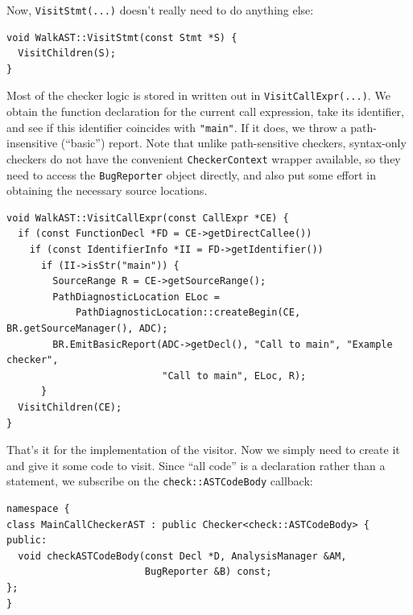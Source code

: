 \documentclass[a4paper,12pt]{article}
\newenvironment{nobr}{\begin{minipage}{\textwidth}\setlength\parskip{1em}
}{\end{minipage}\ignorespacesafterend}
\begin{document}
\begin{nobr}
Now, \lstinline|VisitStmt(...)| doesn't really need to do anything else:
\begin{lstlisting}[style=cplusplus,numbers=none]
void WalkAST::VisitStmt(const Stmt *S) {
  VisitChildren(S);
}
\end{lstlisting}
\end{nobr}

\begin{nobr}
Most of the checker logic is stored in written out in \lstinline|VisitCallExpr(...)|. We obtain the function declaration for the current call expression, take its identifier, and see if this identifier coincides with \lstinline|"main"|. If it does, we throw a path-insensitive (``basic'') report. Note that unlike path-sensitive checkers, syntax-only checkers do not have the convenient \lstinline|CheckerContext| wrapper available, so they need to access the \lstinline|BugReporter| object directly, and also put some effort in obtaining the necessary source locations.
\begin{lstlisting}[style=cplusplus,numbers=none]
void WalkAST::VisitCallExpr(const CallExpr *CE) {
  if (const FunctionDecl *FD = CE->getDirectCallee())
    if (const IdentifierInfo *II = FD->getIdentifier())
      if (II->isStr("main")) {
        SourceRange R = CE->getSourceRange();
        PathDiagnosticLocation ELoc =
            PathDiagnosticLocation::createBegin(CE, BR.getSourceManager(), ADC);
        BR.EmitBasicReport(ADC->getDecl(), "Call to main", "Example checker",
                           "Call to main", ELoc, R);
      }
  VisitChildren(CE);
}
\end{lstlisting}
\end{nobr}

\begin{nobr}
That's it for the implementation of the visitor. Now we simply need to create it and give it some code to visit. Since ``all code'' is a declaration rather than a statement, we subscribe on the \lstinline|check::ASTCodeBody| callback:

\begin{lstlisting}[style=cplusplus,numbers=none]
namespace {
class MainCallCheckerAST : public Checker<check::ASTCodeBody> {
public:
  void checkASTCodeBody(const Decl *D, AnalysisManager &AM,
                        BugReporter &B) const;
};
}
\end{lstlisting}
\end{nobr}
\end{document}
